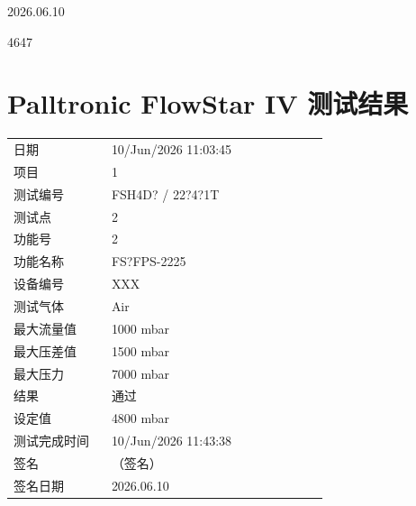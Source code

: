 \documentclass[UTF8,10pt,a4paper,fontset=fandol]{ctexart}
\newcommand{\fieldvalue}[1]{#1}
\newcommand{\handwritten}[1]{#1}
\begin{document}
\fieldvalue{\handwritten{2026.06.10}}

\handwritten{4647}

\newpage

\section*{Palltronic FlowStar IV 测试结果}

\begin{tabular}{@{}p{0.28\linewidth}p{0.62\linewidth}@{}}
日期 &
\fieldvalue{10/Jun/2026 11:03:45}
\\
项目 &
\fieldvalue{1}
\\
测试编号 &
\fieldvalue{FSH4D? / 22?4?1T}
\\
测试点 &
\fieldvalue{2}
\\
功能号 &
\fieldvalue{2}
\\
功能名称 &
\fieldvalue{FS?FPS-2225}
\\
设备编号 &
\fieldvalue{XXX}
\\
测试气体 &
\fieldvalue{Air}
\\
最大流量值 &
\fieldvalue{1000 mbar}
\\
最大压差值 &
\fieldvalue{1500 mbar}
\\
最大压力 &
\fieldvalue{7000 mbar}
\\
结果 &
\fieldvalue{通过}
\\
设定值 &
\fieldvalue{4800 mbar}
\\
测试完成时间 &
\fieldvalue{10/Jun/2026 11:43:38}
\\
签名 &
\fieldvalue{\handwritten{（签名）}}
\\
签名日期 &
\fieldvalue{\handwritten{2026.06.10}}
\end{tabular}
\end{document}
